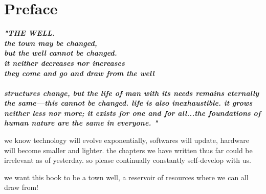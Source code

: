 
\SkipTocEntry\chapter*{Preface}
\addtocounter{section}{1}
\begin{fullwidth}

{\itshape\bfseries "THE WELL.
\\
the town may be changed,
\\
but the well cannot be changed.
\\
it neither decreases nor increases
\\
they come and go and draw from the well
\\
\\
structures change, but the life of man with its needs remains eternally the same—this cannot be changed. life is also inexhaustible. it grows neither less nor more; it exists for one and for all...the foundations of human nature are the same in everyone. "
}

we know technology will evolve exponentially, softwares will update, hardware will become smaller and lighter. the chapters we have written thus far could be irrelevant as of yesterday. so please continually constantly self-develop with us. 

we want this book to be a town well, a reservoir of resources where we can all draw from!

\clearpage
\end{fullwidth}
